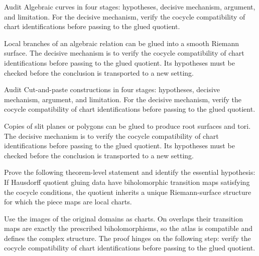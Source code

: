 \begin{problem}\label{prob:iv25-problem-07}
Audit Algebraic curves in four stages: hypotheses, decisive mechanism, argument, and limitation. For the decisive mechanism, verify the cocycle compatibility of chart identifications before passing to the glued quotient.
\end{problem}
\begin{solution}
Local branches of an algebraic relation can be glued into a smooth Riemann surface. The decisive mechanism is to verify the cocycle compatibility of chart identifications before passing to the glued quotient. Its hypotheses must be checked before the conclusion is transported to a new setting.
\end{solution}

\begin{problem}\label{prob:iv25-problem-08}
Audit Cut-and-paste constructions in four stages: hypotheses, decisive mechanism, argument, and limitation. For the decisive mechanism, verify the cocycle compatibility of chart identifications before passing to the glued quotient.
\end{problem}
\begin{solution}
Copies of slit planes or polygons can be glued to produce root surfaces and tori. The decisive mechanism is to verify the cocycle compatibility of chart identifications before passing to the glued quotient. Its hypotheses must be checked before the conclusion is transported to a new setting.
\end{solution}

\begin{problem}\label{prob:iv25-problem-09}
Prove the following theorem-level statement and identify the essential hypothesis: If Hausdorff quotient gluing data have biholomorphic transition maps satisfying the cocycle conditions, the quotient inherits a unique Riemann-surface structure for which the piece maps are local charts.
\end{problem}
\begin{solution}
Use the images of the original domains as charts. On overlaps their transition maps are exactly the prescribed biholomorphisms, so the atlas is compatible and defines the complex structure. The proof hinges on the following step: verify the cocycle compatibility of chart identifications before passing to the glued quotient.
\end{solution}

